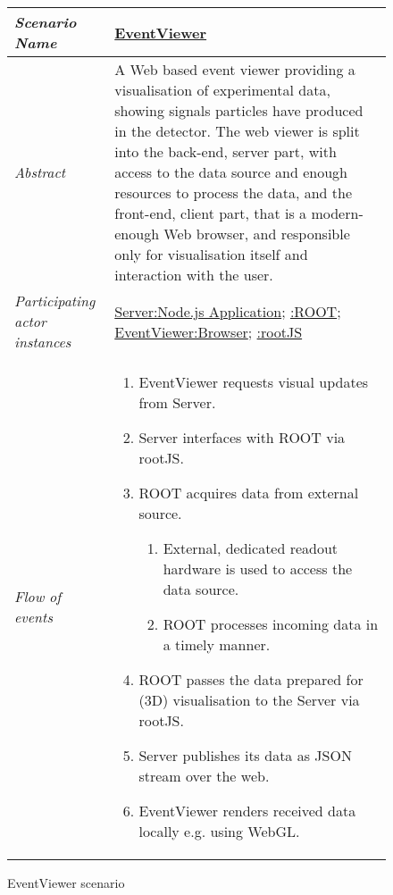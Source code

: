 \begin{figure}[htb]
	\centering
	\begin{longtable}{p{3cm} @{\hskip 1cm} p{12cm}}
		\hline
		\textit{Scenario Name} & \underline{EventViewer}\\
		\hline
		\textit{Abstract} &
		A Web based event viewer providing a visualisation of experimental data, showing signals particles have produced in the detector.
		The web viewer is split into the back-end, server part, with access to
	    the data source and enough resources to process the data, and the front-end, client part, that is a modern-enough Web browser, and responsible only for visualisation itself and interaction with the user.
		\\
		\hline
		\textit{Participating actor instances} & 
		\underline{Server:Node.js Application}; \underline{:ROOT}; \underline{EventViewer:Browser}; \underline{:rootJS}\\
		\hline
		\textit{Flow of events} &
		\begin{enumerate}
			\item EventViewer requests visual updates from Server.
			\item Server interfaces with ROOT via rootJS.
			\item ROOT acquires data from external source.
			\begin{enumerate}
					\item External, dedicated readout hardware is used to access the data source.
					\item ROOT processes incoming data in a timely manner.
			\end{enumerate}
			\item ROOT passes the data prepared for (3D) visualisation to the Server via rootJS.
			\item Server publishes its data as JSON stream over the web.
			\item EventViewer renders received data locally e.g. using WebGL.
		\end{enumerate}
		\\
		\hline
	\end{longtable}
	\caption{EventViewer scenario}
\end{figure}
